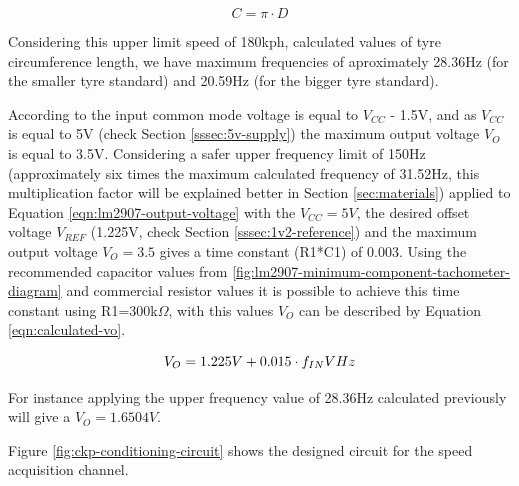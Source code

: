 			\begin{equation}\label{eqn:diameter-to-length}
				C = \pi \cdot D
			\end{equation}

			Considering this upper limit speed of 180kph, calculated values of tyre circumference length, we have maximum frequencies of aproximately 28.36Hz (for the smaller tyre standard) and 20.59Hz (for the bigger tyre standard). 
			\par
			According to \cite{lm2907-datasheet} the input common mode voltage is equal to $V_{CC}$ - 1.5V, and as $V_{CC}$ is equal to 5V (check Section \ref{sssec:5v-supply}) the maximum output voltage $V_{O}$ is equal to 3.5V. Considering a safer upper frequency limit of 150Hz (approximately six times the maximum calculated frequency of 31.52Hz, this multiplication factor will be explained better in Section \ref{sec:materials}) applied to Equation \ref{eqn:lm2907-output-voltage} with the $V_{CC}=5V$, the desired offset voltage $V_{REF}$ (1.225V, check Section \ref{sssec:1v2-reference}) and the maximum output voltage $V_{O}=3.5$ gives a time constant (R1*C1) of 0.003. Using the recommended capacitor values from \ref{fig:lm2907-minimum-component-tachometer-diagram} and commercial resistor values it is possible to achieve this time constant using R1=300k$\Omega$, with this values $V_{O}$ can be described by Equation \ref{eqn:calculated-vo}.

			\begin{equation}\label{eqn:calculated-vo}
				V_{O}=1.225V + 0.015 \cdot f_{IN}   V\/Hz
			\end{equation}

			For instance applying the upper frequency value of 28.36Hz calculated previously will give a $V_{O}=1.6504V$.
			\par

			\par
			Figure \ref{fig:ckp-conditioning-circuit} shows the designed circuit for the speed acquisition channel.

